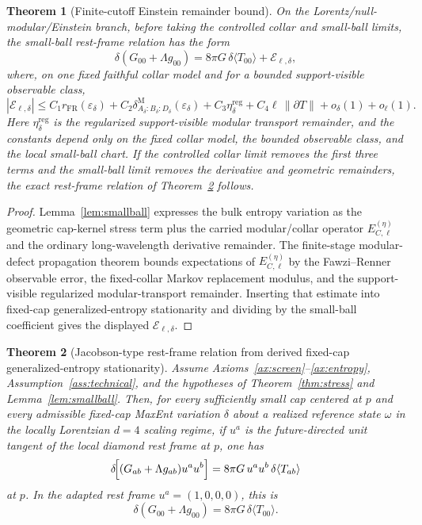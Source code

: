 \documentclass[11pt]{article}
\newtheorem{theorem}{Theorem}[section]
\begin{document}
\begin{theorem}[Finite-cutoff Einstein remainder bound]\label{thm:einstein-remainder}
On the Lorentz/null-modular/Einstein branch, before taking the controlled
collar and small-ball limits, the small-ball rest-frame relation has the form
\[
\delta\!\left(G_{00}+\Lambda g_{00}\right)
=
8\pi G\,\delta\langle T_{00}\rangle
+\mathcal E_{\ell,\delta},
\]
where, on one fixed faithful collar model and for a bounded support-visible
observable class,
\[
|\mathcal E_{\ell,\delta}|
\le
C_1 r_{\mathrm{FR}}(\varepsilon_\delta)
+C_2\delta^{\mathrm M}_{A_\delta:B_\delta:D_\delta}(\varepsilon_\delta)
+C_3\eta^{\mathrm{reg}}_\delta
+C_4\ell\,\|\partial T\|
+o_\delta(1)+o_\ell(1).
\]
Here \(\eta^{\mathrm{reg}}_\delta\) is the regularized support-visible modular
transport remainder, and the constants depend only on the fixed collar model,
the bounded observable class, and the local small-ball chart. If the controlled
collar limit removes the first three terms and the small-ball limit removes
the derivative and geometric remainders, the exact rest-frame relation of
Theorem~\ref{thm:einstein} follows.
\end{theorem}

\begin{proof}
Lemma~\ref{lem:smallball} expresses the bulk entropy variation as the geometric
cap-kernel stress term plus the carried modular/collar operator
\(E^{(\eta)}_{C,\ell}\) and the ordinary long-wavelength derivative
remainder. The finite-stage modular-defect propagation theorem bounds
expectations of \(E^{(\eta)}_{C,\ell}\) by the Fawzi--Renner observable error,
the fixed-collar Markov replacement modulus, and the support-visible
regularized modular-transport remainder. Inserting that estimate into
fixed-cap generalized-entropy stationarity and dividing by the
small-ball coefficient gives the displayed \(\mathcal E_{\ell,\delta}\).
\end{proof}

\begin{theorem}[Jacobson-type rest-frame relation from derived fixed-cap generalized-entropy stationarity]\label{thm:einstein}
Assume Axioms~\ref{ax:screen}--\ref{ax:entropy}, Assumption~\ref{ass:technical}, and the hypotheses of Theorem~\ref{thm:stress} and Lemma~\ref{lem:smallball}. Then, for every sufficiently small cap centered at $p$ and every admissible fixed-cap MaxEnt variation $\delta$ about a realized reference state $\omega$ in the locally Lorentzian $d=4$ scaling regime, if $u^a$ is the future-directed unit tangent of the local diamond rest frame at $p$, one has
\[
\delta\!\Bigl[(G_{ab}+\Lambda g_{ab})u^a u^b\Bigr]
=
8\pi G\,u^a u^b\,\delta\langle T_{ab}\rangle
\]
at $p$. In the adapted rest frame $u^a=(1,0,0,0)$, this is
\[
\delta\!\left(G_{00}+\Lambda g_{00}\right)=8\pi G\,\delta\langle T_{00}\rangle.
\]
\end{theorem}
\end{document}
